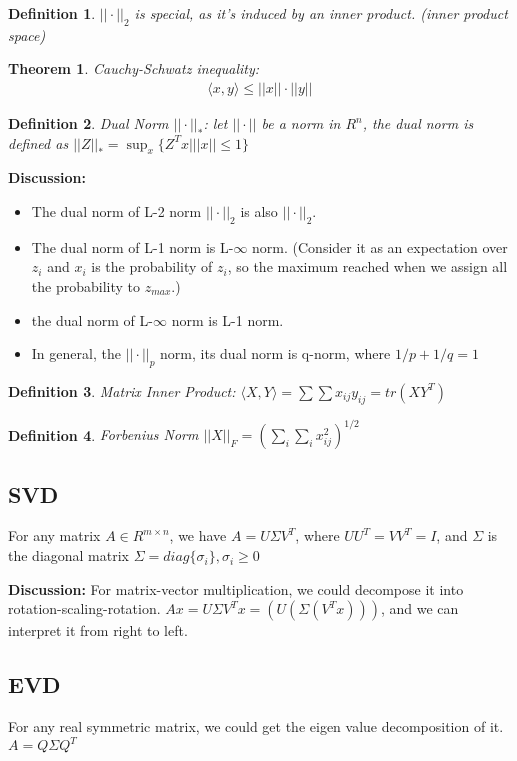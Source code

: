 \documentclass[12pt]{article}
\newtheorem{theorem}{Theorem}[section]
\newtheorem{definition}{Definition}[section]
\begin{document}
\begin{definition}
	$||\cdot||_2$ is special, as it's induced by an inner product. (inner product space)
\end{definition}
\begin{theorem}
	Cauchy-Schwatz inequality: 
	\begin{eqnarray}
		\langle x,y\rangle \le ||x||\cdot ||y||
	\end{eqnarray}
\end{theorem}
\begin{definition}
	Dual Norm $||\cdot||_*$: let $||\cdot||$ be a norm in $R^n$, the dual norm is defined as $||Z||_*=\sup_x\{Z^Tx| ||x||\le 1\}$
\end{definition}
{\bf Discussion:} 
\begin{itemize}
	\item The dual norm of L-2 norm $||\cdot||_2$ is also $||\cdot||_2$. 
	\item The dual norm of L-1 norm is L-$\infty$ norm. (Consider it as an expectation over $z_i$ and $x_i$ is the probability of $z_i$, so the maximum reached when we assign all the probability to $z_{max}$.)
	\item the dual norm of L-$\infty$ norm is L-1 norm.
	\item In general, the $||\cdot||_p$ norm, its dual norm is q-norm, where $1/p + 1/q = 1$
\end{itemize}

\begin{definition}
	Matrix Inner Product: $\langle X,Y\rangle = \sum\sum x_{ij}y_{ij}=tr(XY^T)$
\end{definition}
\begin{definition}
	Forbenius Norm $||X||_F = (\sum_i\sum_i x_{ij}^2)^{1/2}$
\end{definition}
\subsection{SVD}
For any matrix $A\in R^{m\times n}$, we have $A=U\Sigma V^T$, where $UU^T=VV^T=I$, and $\Sigma$ is the diagonal matrix $\Sigma=diag\{\sigma_i\}, \sigma_i\ge 0$

{\bf Discussion:} For matrix-vector multiplication, we could decompose it into rotation-scaling-rotation. $Ax=U\Sigma V^Tx=(U(\Sigma(V^Tx)))$, and we can interpret it from right to left.

\subsection{EVD}
For any real symmetric matrix, we could get the eigen value decomposition of it. $A=Q\Sigma Q^T$
\end{document}
